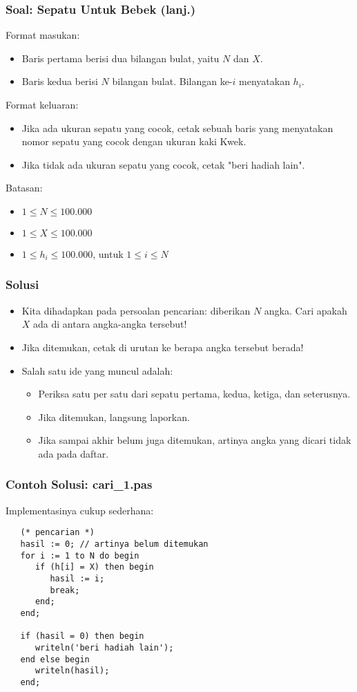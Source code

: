 \documentclass{beamer}
\begin{document}
\begin{frame}
\frametitle{Soal: Sepatu Untuk Bebek (lanj.)}
Format masukan:
\begin{itemize}
	\item Baris pertama berisi dua bilangan bulat, yaitu $N$ dan $X$.
	\item Baris kedua berisi $N$ bilangan bulat. Bilangan ke-$i$ menyatakan $h_i$.
\end{itemize}
Format keluaran:
\begin{itemize}
	\item Jika ada ukuran sepatu yang cocok, cetak sebuah baris yang menyatakan nomor sepatu yang cocok dengan ukuran kaki Kwek.
	\item Jika tidak ada ukuran sepatu yang cocok, cetak "beri hadiah lain".
\end{itemize}
Batasan:
\begin{itemize}
	\item $1 \le N \le 100.000$
	\item $1 \le X \le 100.000$
	\item $1 \le h_i \le 100.000$, untuk $1 \le i \le N$
\end{itemize}
\end{frame}

\begin{frame}
\frametitle{Solusi}
\begin{itemize}
	\item Kita dihadapkan pada persoalan pencarian: diberikan $N$ angka. Cari apakah $X$ ada di antara angka-angka tersebut!
	\item Jika ditemukan, cetak di urutan ke berapa angka tersebut berada!
	\item Salah satu ide yang muncul adalah:
	\begin{itemize}
		\item Periksa satu per satu dari sepatu pertama, kedua, ketiga, dan seterusnya.
		\item Jika ditemukan, langsung laporkan.
		\item Jika sampai akhir belum juga ditemukan, artinya angka yang dicari tidak ada pada daftar.
	\end{itemize}
\end{itemize}
\end{frame}

\begin{frame}[fragile]
\frametitle{Contoh Solusi: cari\_1.pas}
Implementasinya cukup sederhana:
\begin{lstlisting}
   (* pencarian *)
   hasil := 0; // artinya belum ditemukan
   for i := 1 to N do begin
      if (h[i] = X) then begin
         hasil := i;
         break;
      end;
   end;

   if (hasil = 0) then begin
      writeln('beri hadiah lain');
   end else begin
      writeln(hasil);
   end;
\end{lstlisting}
\end{frame}
\end{document}
